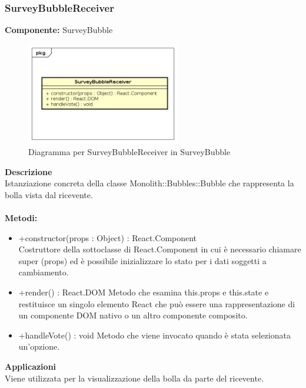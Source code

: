 \clearpage

\subsubsection{SurveyBubbleReceiver}
\textbf{Componente:}  SurveyBubble\\
   \FloatBarrier
   \begin{figure}[ht]
   \centering
   \includegraphics[width=0.6\textwidth]{img/single-SurveyBubbleReceiver}
   \caption{{Diagramma per SurveyBubbleReceiver in SurveyBubble}}
\end{figure}
\FloatBarrier
\textbf{Descrizione}\\
Istanziazione concreta della classe Monolith::Bubbles::Bubble che rappresenta la bolla vista dal ricevente.
\\
\\
\textbf{Metodi:} 
\begin{itemize}
\item +constructor(props : Object) : React.Component 
\\
Costruttore della sottoclasse di React.Component in cui è necessario chiamare super (props) ed è possibile inizializzare lo stato per i dati soggetti a cambiamento.

\item +render() : React.DOM
Metodo che esamina this.props e this.state e restituisce un singolo elemento React che può essere una rappresentazione di un componente DOM nativo o un altro componente composito.

\item +handleVote() : void
Metodo che viene invocato quando è stata selezionata un'opzione. 

\end{itemize} 


\textbf{Applicazioni}\\
Viene utilizzata per la visualizzazione della bolla da parte del ricevente. 


\clearpage


